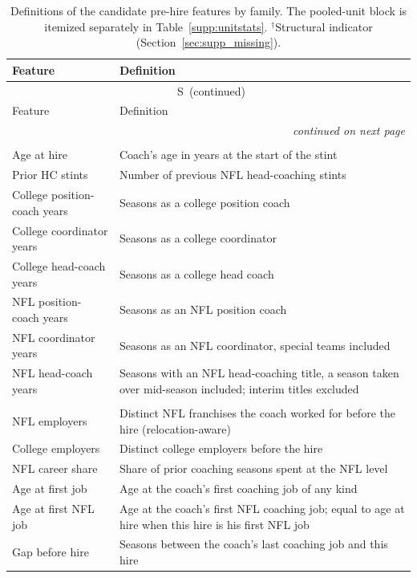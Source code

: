 \documentclass[12pt,USenglish]{article}
\renewcommand{\thetable}{S\arabic{table}}
\begin{document}
{\footnotesize\singlespacing
\begin{longtable}{@{}l p{8.8cm}@{}}
\caption{Definitions of the candidate pre-hire features by family. The pooled-unit block is itemized separately in Table~\ref{supp:unitstats}. $^{\dagger}$Structural indicator (Section~\ref{sec:supp_missing}).}
\label{supp:featuredefs}\\
\toprule
Feature & Definition \\
\midrule
\endfirsthead
\multicolumn{2}{c}{\tablename~\thetable\ (continued)}\\[2pt]
\toprule
Feature & Definition \\
\midrule
\endhead
\midrule
\multicolumn{2}{r}{\footnotesize\itshape continued on next page}\\
\endfoot
\bottomrule
\endlastfoot
\multicolumn{2}{@{}l}{\emph{Core experience (8)}}\\[2pt]
Age at hire & Coach's age in years at the start of the stint \\
Prior HC stints & Number of previous NFL head-coaching stints \\
College position-coach years & Seasons as a college position coach \\
College coordinator years & Seasons as a college coordinator \\
College head-coach years & Seasons as a college head coach \\
NFL position-coach years & Seasons as an NFL position coach \\
NFL coordinator years & Seasons as an NFL coordinator, special teams included \\
NFL head-coach years & Seasons with an NFL head-coaching title, a season taken over mid-season included; interim titles excluded \\
\addlinespace
\multicolumn{2}{@{}l}{\emph{Career structure (19)}}\\[2pt]
NFL employers & Distinct NFL franchises the coach worked for before the hire (relocation-aware) \\
College employers & Distinct college employers before the hire \\
NFL career share & Share of prior coaching seasons spent at the NFL level \\
Age at first job & Age at the coach's first coaching job of any kind \\
Age at first NFL job & Age at the coach's first NFL coaching job; equal to age at hire when this hire is his first NFL job \\
Gap before hire & Seasons between the coach's last coaching job and this hire \\

\end{longtable}}
\end{document}
